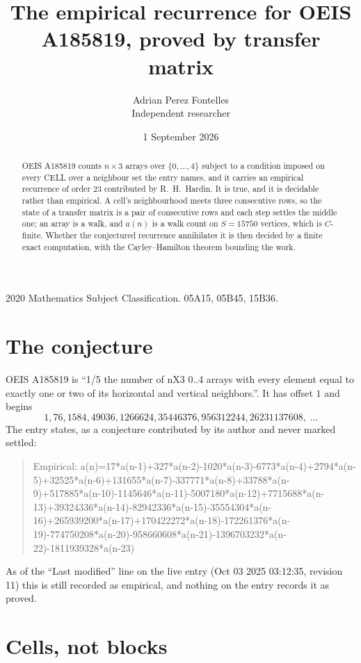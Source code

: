 \documentclass[11pt,a4paper]{article}
\title{The empirical recurrence for OEIS A185819, proved by transfer matrix}
\author{Adrian Perez Fontelles\\ \small Independent researcher}
\date{1 September 2026}
\theoremstyle{plain}
\theoremstyle{definition}
\begin{document}
\maketitle

\begin{abstract}
OEIS A185819 counts $n\times3$ arrays over $\{0,\dots,4\}$ subject to a condition imposed on
every CELL over a neighbour set the entry names, and it carries an empirical recurrence of
order $23$ contributed by R.~H.~Hardin. It is true, and it is decidable rather than
empirical. A cell's neighbourhood meets three consecutive rows, so the state of a transfer
matrix is a pair of consecutive rows and each step settles the middle one; an array is a
walk, and $a(n)$ is a walk count on $S=15750$ vertices, which is $C$-finite. Whether the
conjectured recurrence annihilates it is then decided by a finite exact computation, with the
Cayley--Hamilton theorem bounding the work.
\end{abstract}

\noindent\small 2020 Mathematics Subject Classification. 05A15, 05B45, 15B36.\normalsize

\section{The conjecture}

OEIS A185819 is ``1/5 the number of nX3 0..4 arrays with every element equal to exactly one or two of its horizontal and vertical neighbors.''. It has offset $1$ and begins
\[
1, 76, 1584, 49036, 1266624, 35446376, 956312244, 26231137608,\ \dots
\]
The entry states, as a conjecture contributed by its author and never marked settled:
\begin{quote}
Empirical: a(n)=17*a(n-1)+327*a(n-2)-1020*a(n-3)-6773*a(n-4)+2794*a(n-5)+32525*a(n-6)+131655*a(n-7)-337771*a(n-8)+33788*a(n-9)+517885*a(n-10)-1145646*a(n-11)-5007180*a(n-12)+7715688*a(n-13)+39324336*a(n-14)-82942336*a(n-15)-35554304*a(n-16)+265939200*a(n-17)+170422272*a(n-18)-172261376*a(n-19)-774750208*a(n-20)-958660608*a(n-21)-1396703232*a(n-22)-1811939328*a(n-23)
\end{quote}
As of the ``Last modified'' line on the live entry (Oct 03 2025 03:12:35, revision 11) this is still
recorded as empirical, and nothing on the entry records it as proved.

\section{Cells, not blocks}
\end{document}
